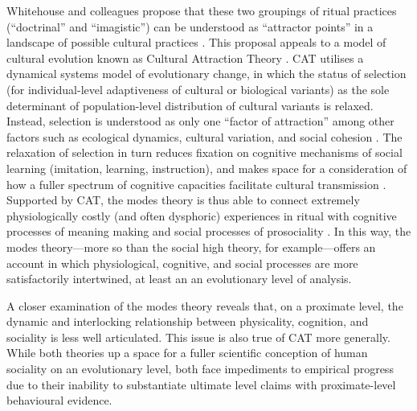 \begin{CJK}{UTF8}{gbsn}
Whitehouse and colleagues propose that these two groupings of ritual practices (``doctrinal'' and ``imagistic'') can be understood as ``attractor points'' in a landscape of possible cultural practices \citep{Atkinson2011,Whitehouse2014}.  This proposal appeals to a model of cultural evolution known as Cultural Attraction Theory \citep[hereafter CAT; an extension of Sperber's ``epidemiology of representations,'' see][]{Sperber1996,Claidiere2007,Claidiere2014}.  CAT utilises a dynamical systems model of evolutionary change, in which the status of selection (for individual-level adaptiveness of cultural or biological variants) as the sole determinant of population-level distribution of cultural variants is relaxed.  Instead, selection is understood as only one ``factor of attraction'' among other factors such as ecological dynamics, cultural variation, and social cohesion \citep{Henrich2014,Claidiere2014,Heyes2011}.  The relaxation of selection in turn reduces fixation on cognitive mechanisms of social learning (imitation, learning, instruction), and makes space for a consideration of how a fuller spectrum of cognitive capacities facilitate cultural transmission \citep{Acerbi2015}.  Supported by CAT, the modes theory is thus able to connect extremely physiologically costly (and often dysphoric) experiences in ritual with cognitive processes of meaning making and social processes of prosociality \citep[including extreme levels of pro-group sacrifice ][]{Whitehouse2014,Whitehouse2017}.  In this way, the modes theory---more so than the social high theory, for example---offers an account in which physiological, cognitive, and social processes are more satisfactorily intertwined, at least an an evolutionary level of analysis.

A closer examination of the modes theory reveals that, on a proximate level, the dynamic and interlocking relationship between physicality, cognition, and sociality is less well articulated.  This issue is also true of CAT more generally.  While both theories up a space for a fuller scientific conception of human sociality on an evolutionary level, both face impediments to empirical progress due to their inability to  substantiate ultimate level claims with proximate-level behavioural evidence.


\end{CJK}
